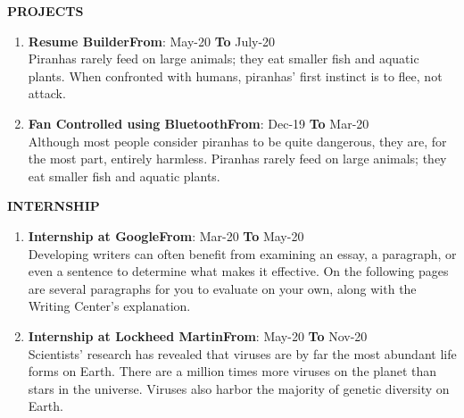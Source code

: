 \documentclass{article}
\begin{document}
{{\begin{itemize}
\end{itemize} 
}

 
\vspace{10pt}

{\large{\textbf{\uppercase{projects}}}}

\vspace{3pt}
\begin{enumerate}
	\item {\textbf{Resume Builder}}\hfill {\textbf{From}}: May-20 {\textbf{To}} July-20\\
	Piranhas rarely feed on large animals; they eat smaller fish and aquatic plants. When confronted with humans, piranhas' first instinct is to flee, not attack. 
	\item {\textbf{Fan Controlled using Bluetooth}}\hfill {\textbf{From}}: Dec-19 {\textbf{To}} Mar-20\\
	Although most people consider piranhas to be quite dangerous, they are, for the most part, entirely harmless. Piranhas rarely feed on large animals; they eat smaller fish and aquatic plants.
\end{enumerate}
	
\vspace{10pt}
{\large{\textbf{\uppercase{Internship}}}}

\vspace{3pt}
\begin{enumerate}
	\item {\textbf{Internship at Google}}\hfill {\textbf{From}}: Mar-20 {\textbf{To}} May-20\\
	Developing writers can often benefit from examining an essay, a paragraph, or even a sentence to determine what makes it effective. On the following pages are several paragraphs for you to evaluate on your own, along with the Writing Center's explanation.
	\item {\textbf{Internship at Lockheed Martin}}\hfill {\textbf{From}}: May-20 {\textbf{To}} Nov-20\\
	 Scientists' research has revealed that viruses are by far the most abundant life forms on Earth. There are a million times more viruses on the planet than stars in the universe. Viruses also harbor the majority of genetic diversity on Earth.
\end{enumerate}

\vspace{10pt}

}
\end{document}
